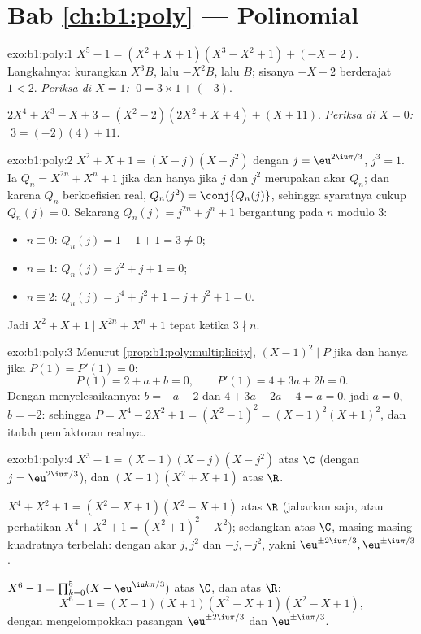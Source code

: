 \section*{Bab \ref{ch:b1:poly} --- Polinomial}

\begin{solution}{exo:b1:poly:1}
$X^5 - 1 = (X^2 + X + 1)(X^3 - X^2 + 1) + (-X - 2)$. Langkahnya: kurangkan
$X^3 B$, lalu $-X^2 B$, lalu $B$; sisanya $-X - 2$ berderajat
$1 < 2$. \emph{Periksa di $X = 1$:} $\;0 = 3 \times 1 + (-3)$.

$2X^4 + X^3 - X + 3 = (X^2 - 2)(2X^2 + X + 4) + (X + 11)$. \emph{Periksa
di $X = 0$:} $\;3 = (-2)(4) + 11$.
\end{solution}

\begin{solution}{exo:b1:poly:2}
$X^2 + X + 1 = (X - j)(X - j^2)$ dengan $j = \eu^{2\iu\pi/3}$, $j^3 =
1$. Ia  $Q_n = X^{2n} + X^n + 1$ jika dan hanya jika $j$ dan $j^2$ merupakan akar
$Q_n$; dan karena $Q_n$ berkoefisien real, $Q_n(j^2) =
\conj{Q_n(j)}$, sehingga syaratnya cukup $Q_n(j) = 0$. Sekarang $Q_n(j) =
j^{2n} + j^n + 1$ bergantung pada $n$ modulo $3$:
\begin{itemize}
  \item $n \equiv 0$: $Q_n(j) = 1 + 1 + 1 = 3 \neq 0$;
  \item $n \equiv 1$: $Q_n(j) = j^2 + j + 1 = 0$;
  \item $n \equiv 2$: $Q_n(j) = j^4 + j^2 + 1 = j + j^2 + 1 = 0$.
\end{itemize}
Jadi $X^2 + X + 1 \mid X^{2n} + X^n + 1$ tepat ketika $3 \nmid n$.
\end{solution}

\begin{solution}{exo:b1:poly:3}
Menurut \cref{prop:b1:poly:multiplicity}, $(X-1)^2 \mid P$ jika dan hanya jika $P(1) =
P'(1) = 0$:
\[
P(1) = 2 + a + b = 0, \qquad P'(1) = 4 + 3a + 2b = 0 .
\]
Dengan menyelesaikannya: $b = -a - 2$ dan $4 + 3a - 2a - 4 = a = 0$, jadi $a = 0$, $b =
-2$: sehingga $P = X^4 - 2X^2 + 1 = (X^2 - 1)^2 = (X-1)^2 (X+1)^2$, dan itulah
pemfaktoran realnya.
\end{solution}

\begin{solution}{exo:b1:poly:4}
$X^3 - 1 = (X - 1)(X - j)(X - j^2)$ atas $\C$ (dengan $j = \eu^{2\iu\pi/3}$),
dan $(X - 1)(X^2 + X + 1)$ atas $\R$.

$X^4 + X^2 + 1 = (X^2 + X + 1)(X^2 - X + 1)$ atas $\R$ (jabarkan saja,
atau perhatikan $X^4 + X^2 + 1 = (X^2+1)^2 - X^2$); sedangkan atas $\C$, masing-masing kuadratnya
terbelah: dengan akar $j, j^2$ dan $-j, -j^2$, yakni $\eu^{\pm 2\iu\pi/3},
\eu^{\pm\iu\pi/3}$.

$X^6 - 1 = \prod_{k=0}^{5} (X - \eu^{\iu k\pi/3})$ atas $\C$, dan atas
$\R$:
\[
X^6 - 1 = (X-1)(X+1)(X^2 + X + 1)(X^2 - X + 1),
\]
dengan mengelompokkan pasangan  $\eu^{\pm 2\iu\pi/3}$ dan $\eu^{\pm
\iu\pi/3}$.
\end{solution}

